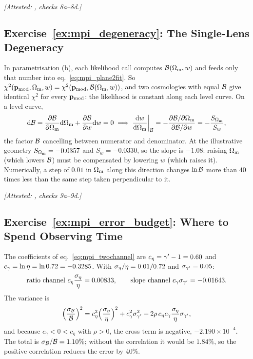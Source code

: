 \emph{[Attested: ,
checks 8a--8d.]}

\subsection*{Exercise~\ref{ex:mpi_degeneracy}: The Single-Lens Degeneracy}

In parametrisation (b), each likelihood call computes
$\mathcal{B}(\Omega_{\mathrm{m}},w)$ and feeds only that number into
eq.~\eqref{eq:mpi_plane2fit}.  So
$\chi^2(\mathbf{p}_{\rm mod},\Omega_{\mathrm{m}},w)=\chi^2(\mathbf{p}_{\rm mod},\mathcal{B}(\Omega_{\mathrm{m}},w))$,
and two cosmologies with equal $\mathcal{B}$ give identical $\chi^2$ for every
$\mathbf{p}_{\rm mod}$: the likelihood is constant along each level
curve.  On a level curve,
\begin{equation*}
  \dd\mathcal{B}=\frac{\partial \mathcal{B}}{\partial \Omega_{\mathrm{m}}}\dd\Omega_{\mathrm{m}}+\frac{\partial \mathcal{B}}{\partial w}\dd w=0
  \;\Longrightarrow\;
  \frac{\mathrm{d} w}{\mathrm{d} \Omega_{\mathrm{m}}}\bigg|_{\mathcal{B}}
  =-\frac{\partial\mathcal{B}/\partial\Omega_{\mathrm{m}}}{\partial\mathcal{B}/\partial w}
  =-\frac{S_{\Omega_{\mathrm{m}}}}{S_w},
\end{equation*}
the factor $\mathcal{B}$ cancelling between numerator and denominator.  At the
illustrative geometry $S_{\Omega_{\mathrm{m}}}=-0.0357$ and $S_w=-0.0330$, so the
slope is $-1.08$: raising $\Omega_{\mathrm{m}}$ (which lowers $\mathcal{B}$) must be
compensated by lowering $w$ (which raises it).  Numerically, a step of
$0.01$ in $\Omega_{\mathrm{m}}$ along this direction changes $\ln\mathcal{B}$ more than
$40$ times less than the same step taken perpendicular to it.

\emph{[Attested: ,
checks 9a--9d.]}

\subsection*{Exercise~\ref{ex:mpi_error_budget}: Where to Spend Observing Time}

The coefficients of eq.~\eqref{eq:mpi_twochannel} are
$c_\eta=\gamma'-1=0.60$ and $c_\gamma=\ln\eta=\ln0.72=-0.3285$.  With
$\sigma_\eta/\eta=0.01/0.72$ and $\sigma_{\gamma'}=0.05$:
\begin{equation*}
  \text{ratio channel } c_\eta\frac{\sigma_\eta}{\eta}=0.00833,\qquad
  \text{slope channel } c_\gamma\sigma_{\gamma'}=-0.01643 .
\end{equation*}
The variance is
\begin{equation*}
  \Big(\frac{\sigma_{\mathcal{B}}}{\mathcal{B}}\Big)^2
  =c_\eta^2\Big(\frac{\sigma_\eta}{\eta}\Big)^2+c_\gamma^2\sigma_{\gamma'}^2
  +2\rho\,c_\eta c_\gamma\frac{\sigma_\eta}{\eta}\sigma_{\gamma'},
\end{equation*}
and because $c_\gamma<0<c_\eta$ with $\rho>0$, the cross term is
negative, $-2.190\times10^{-4}$.  The total is
$\sigma_{\mathcal{B}}/\mathcal{B}=1.10\%$; without the correlation it would be
$1.84\%$, so the positive correlation reduces the error by $40\%$.

